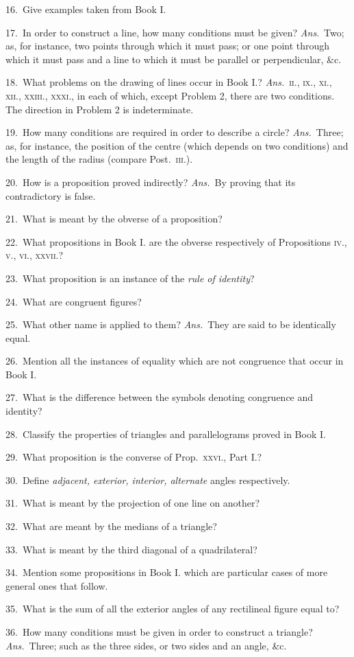 \documentclass[oneside]{book}
\begin{document}
\begin{footnotesize}
16.~Give examples taken from Book I.

17.~In order to construct a line, how many conditions must be
given? \textit{Ans}.\ Two; as, for instance, two points through which
it must pass; or one point through which it must pass and a line
to which it must be parallel or perpendicular, \&c.

18.~What problems on the drawing of lines occur in Book I.?
\textit{Ans.}\ \textsc{ii., ix., xi., xii., xxiii., xxxi.,} in each of which, except
Problem 2, there are two conditions. The direction in
Problem 2 is indeterminate.

19.~How many conditions are required in order to describe a
circle? \textit{Ans.}\ Three; as, for instance, the position of the centre
(which depends on two conditions) and the length of the radius
(compare Post.\ \textsc{iii.}).

20.~How is a proposition proved indirectly? \textit{Ans.}\ By proving
that its contradictory is false.

21.~What is meant by the obverse of a proposition?

22.~What propositions in Book I. are the obverse respectively
of Propositions \textsc{iv., v., vi., xxvii.}?

23.~What proposition is an instance of the \textit{rule of identity}?

24.~What are congruent figures?

25.~What other name is applied to them? \textit{Ans.}\ They are
said to be identically equal.

26.~Mention all the instances of equality which are not
congruence that occur in Book I.

27.~What is the difference between the symbols denoting
congruence and identity?

28.~Classify the properties of triangles and parallelograms
proved in Book I.

29.~What proposition is the converse of Prop.\ \textsc{xxvi.}, Part I.?

30.~Define \textit{adjacent, exterior, interior, alternate} angles
respectively.

31.~What is meant by the projection of one line on another?

32.~What are meant by the medians of a triangle?

33.~What is meant by the third diagonal of a quadrilateral?

34.~Mention some propositions in Book I. which are particular
cases of more general ones that follow.

35.~What is the sum of all the exterior angles of any
rectilineal figure equal to?

36.~How many conditions must be given in order to construct
a triangle? \textit{Ans.}\ Three; such as the three sides, or two sides
and an angle, \&c.
\par\end{footnotesize}
\end{document}
